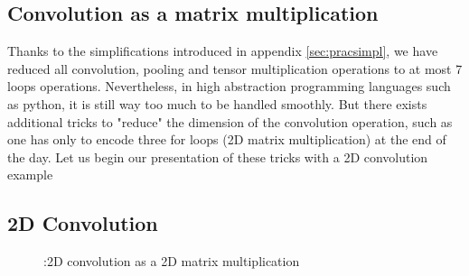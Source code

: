 \begin{subappendices}
\section{Convolution as a matrix multiplication}

Thanks to the simplifications introduced in appendix \ref{sec:pracsimpl}, we have reduced all convolution, pooling and tensor multiplication operations to at most 7 loops operations. Nevertheless, in high abstraction programming languages such as python, it is still way too much to be handled smoothly. But there exists additional tricks to "reduce" the dimension of the convolution operation, such as one has only to encode three for loops (2D matrix multiplication) at the end of the day. Let us begin our presentation of these tricks with a 2D convolution example

\subsection{2D Convolution}


\begin{figure}[H]
\begin{center}
\caption{\label{fig:2dconv}:2D convolution as a 2D matrix multiplication}
\end{center}
\end{figure}



\end{subappendices}
